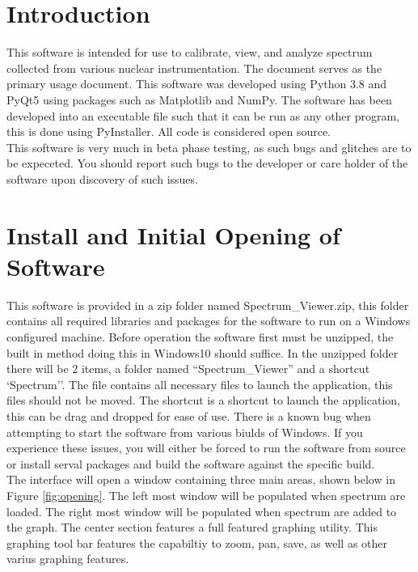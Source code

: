 \section{Introduction}
This software is intended for use to calibrate, view, and analyze spectrum collected from various nuclear instrumentation. The document serves as the primary usage document. This software was developed using Python 3.8 and PyQt5 using packages such as Matplotlib and NumPy. The software has been developed into an executable file such that it can be run as any other program, this is done using PyInstaller. All code is considered open source. \\

This software is very much in beta phase testing, as such bugs and glitches are to be expeceted. You should report such bugs to the developer or care holder of the software upon discovery of such issues.

\section{Install and Initial Opening of Software}
This software is provided in a zip folder named Spectrum\_Viewer.zip, this folder contains all required libraries and packages for the software to run on a Windows configured machine. Before operation the software first must be unzipped, the built in method doing this in Windows10 should suffice. In the unzipped folder there will be 2 items, a folder named ``Spectrum\_Viewer'' and a shortcut `Spectrum''. The file contains all necessary files to launch the application, this files should not be moved. The shortcut is a shortcut to launch the application, this can be drag and dropped for ease of use. There is  a known bug when attempting to start the software from various biulds of Windows. If you experience these issues, you will either be forced to run the software from source or install serval packages and build the software against the specific build.\\

The interface will open a window containing three main areas, shown below in Figure \ref{fig:opening}. The left most window will be populated when spectrum are loaded. The right most window will be populated when spectrum are added to the graph. The center section features a full featured graphing utility. This graphing tool bar features the capabiltiy to zoom, pan, save, as well as other varius graphing features.

